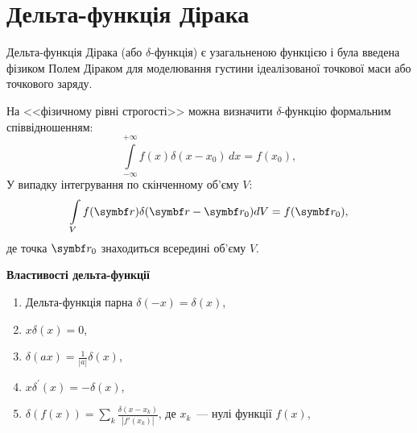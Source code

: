 \section{Дельта-функція Дірака}\setcounter{equation}{0}

Дельта-функція Дірака (або $\delta$-функція) є узагальненою функцією і була введена фізиком Полем Діраком для моделювання густини ідеалізованої точкової маси або точкового заряду.

На <<фізичному рівні строгості>> можна визначити $\delta$-функцію формальним співвідношенням:
\begin{equation}
    \int\limits_{-\infty}^{+\infty}f(x)\delta(x-x_0)\,dx=f(x_0),
\end{equation}
У випадку інтегрування по скінченному об'єму $V$:
\begin{equation}\label{eq:delta3D}
    \int\limits_{V}f(\vect{r})\delta(\vect{r} - \vect{r}_0) dV=f(\vect{r}_0),
\end{equation}
де точка $\vect{r}_0$ знаходиться всередині об'єму $V$.

%
\bigskip\noindent%
\textbf{Властивості дельта-функції}
\bigskip

\begin{enumerate}[label=\alph*)]
\item Дельта-функція парна $\delta(-x) = \delta(x)$,
\item $x\delta(x) = 0$,
\item $\delta(ax) = \frac{1}{|a|}\delta(x)$,
\item  $x\delta^\prime(x)=-\delta(x)$,
\item $\delta(f(x))=\sum\limits_k\frac{\delta(x-x_k)}{|f'(x_k)|}$, де $x_k$~--- нулі функції $f(x)$,

\end{enumerate}

